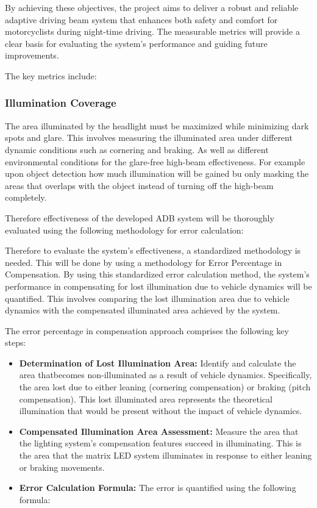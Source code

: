 By achieving these objectives, the project aims to deliver a robust and reliable adaptive driving beam system that enhances both safety and comfort for motorcyclists during night-time driving. The measurable metrics will provide a clear basis for evaluating the system's performance and guiding future improvements.

The key metrics include:

\subsubsection{Illumination Coverage}
The area illuminated by the headlight must be maximized while minimizing dark spots and glare. This involves measuring the illuminated area under different dynamic conditions such as cornering and braking. As well as different environmental conditions for the glare-free high-beam effectiveness. For example upon object detection how much illumination will be gained bu only masking the areas that overlaps with the object instead of turning off the high-beam completely. 


Therefore effectiveness of the developed ADB system will be thoroughly evaluated using the following methodology for error calculation:

Therefore to evaluate the system's effectiveness, a standardized methodology is needed. This will be done by using a methodology for Error Percentage in Compensation\label{method_error}.
By using this standardized error calculation method, the system's performance in compensating for lost illumination due to vehicle dynamics will be quantified. This involves comparing the lost illumination area due to vehicle dynamics with the compensated illuminated area achieved by the system.

The error percentage in compensation approach comprises the following key steps:

\begin{itemize}
    \item \textbf{Determination of Lost Illumination Area:} Identify and calculate the area thatbecomes non-illuminated as a result of vehicle dynamics. Specifically, the area lost due to either leaning (cornering compensation) or braking (pitch compensation). This lost illuminated area represents the theoretical illumination that would be present without the impact of vehicle dynamics.

    \item \textbf{Compensated Illumination Area Assessment:} Measure the area that the lighting system's compensation features succeed in illuminating. This is the area that the matrix LED system illuminates in response to either leaning or braking movements.

    \item \textbf{Error Calculation Formula:} The error is quantified using the following formula:%

\end{itemize}

